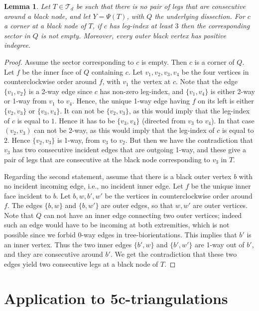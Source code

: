 \documentclass[letter]{amsart}
\numberwithin{theo}{section}
\newtheorem{lemma}[theo]{Lemma}
\theoremstyle{remark}
\def\cT{\mathcal{T}}
\begin{document}
\begin{lemma}\label{lem:legindex2}
Let $T\in\cT_d$ be such that there is no pair of legs that are consecutive around a black node, and let $Y=\Psi(T)$, with $Q$ the underlying dissection. For $c$ a corner at a black node of $T$, if $c$ has leg-index at least $3$ then the corresponding sector in $Q$ is not empty. Moreover, every outer black vertex has positive indegree. 
\end{lemma}
\begin{proof}
Assume the sector corresponding to $c$ is empty. Then $c$ is a corner of $Q$. Let $f$ be the inner face of $Q$ containing $c$. Let $v_1,v_2,v_3,v_4$ be the four vertices   
in counterclockwise order around $f$, with $v_1$ the vertex at $c$. Note that the edge $\{v_1,v_2\}$ is a 2-way edge since $c$ has non-zero leg-index, and $\{v_1,v_4\}$ is either 2-way or 1-way from $v_1$ to $v_4$. Hence, the unique 1-way edge having $f$ on its left is either $\{v_2,v_3\}$ or $\{v_3,v_4\}$. It can not be $\{v_2,v_3\}$, as this would imply that the leg-index of $c$ is equal to $1$. Hence it has to be $\{v_3,v_4\}$ (directed from $v_3$ to $v_4$). In that case $(v_2,v_3)$ can not be 2-way, as this would imply that the leg-index of $c$ is equal to $2$. Hence $\{v_2,v_3\}$ is 1-way, from $v_3$ to $v_2$. But then we have the contradiction that $v_3$ has two consecutive incident edges that are outgoing 1-way, and these give a pair of legs that are consecutive at the black node corresponding to $v_3$ in $T$. 

Regarding the second statement, assume that there is a black outer vertex $b$ with no incident incoming edge, i.e., no incident inner edge. Let $f$ be the unique inner face incident to $b$. Let $b,w,b',w'$ be the vertices in counterclockwise order around $f$. The edges $\{b,w\}$ and $\{b,w'\}$ are outer edges, so that $w,w'$ are outer vertices. Note that $Q$ can not have an inner edge connecting two outer vertices; indeed such an edge would have to be incoming at both extremities, which is not possible since we forbid 0-way edges in tree-biorientations. This implies that $b'$ is an inner vertex. 
Thus the two inner edges $\{b',w\}$ and $\{b',w'\}$ are 1-way out of $b'$, and they are consecutive around $b'$. We get the contradiction that these two edges yield two consecutive legs at a black node of $T$.  
\end{proof}



\section{Application to 5c-triangulations}
\end{document}
